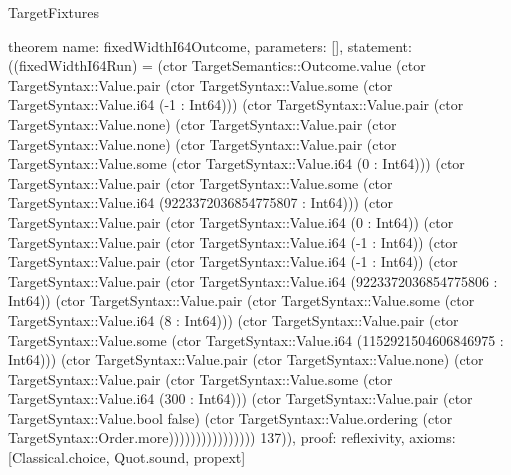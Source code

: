 \begin{lexlean}{TargetFixtures}
\begin{semanticmodule}
theorem{
  name: fixedWidthI64Outcome,
  parameters: [],
  statement: ((fixedWidthI64Run) = (ctor TargetSemantics::Outcome.value (ctor TargetSyntax::Value.pair (ctor TargetSyntax::Value.some (ctor TargetSyntax::Value.i64 (-1 : Int64))) (ctor TargetSyntax::Value.pair (ctor TargetSyntax::Value.none) (ctor TargetSyntax::Value.pair (ctor TargetSyntax::Value.none) (ctor TargetSyntax::Value.pair (ctor TargetSyntax::Value.some (ctor TargetSyntax::Value.i64 (0 : Int64))) (ctor TargetSyntax::Value.pair (ctor TargetSyntax::Value.some (ctor TargetSyntax::Value.i64 (9223372036854775807 : Int64))) (ctor TargetSyntax::Value.pair (ctor TargetSyntax::Value.i64 (0 : Int64)) (ctor TargetSyntax::Value.pair (ctor TargetSyntax::Value.i64 (-1 : Int64)) (ctor TargetSyntax::Value.pair (ctor TargetSyntax::Value.i64 (-1 : Int64)) (ctor TargetSyntax::Value.pair (ctor TargetSyntax::Value.i64 (9223372036854775806 : Int64)) (ctor TargetSyntax::Value.pair (ctor TargetSyntax::Value.some (ctor TargetSyntax::Value.i64 (8 : Int64))) (ctor TargetSyntax::Value.pair (ctor TargetSyntax::Value.some (ctor TargetSyntax::Value.i64 (1152921504606846975 : Int64))) (ctor TargetSyntax::Value.pair (ctor TargetSyntax::Value.none) (ctor TargetSyntax::Value.pair (ctor TargetSyntax::Value.some (ctor TargetSyntax::Value.i64 (300 : Int64))) (ctor TargetSyntax::Value.pair (ctor TargetSyntax::Value.bool false) (ctor TargetSyntax::Value.ordering (ctor TargetSyntax::Order.more)))))))))))))))) 137)),
  proof: reflexivity{},
  axioms: [Classical.choice, Quot.sound, propext]
}


\end{semanticmodule}
\end{lexlean}

